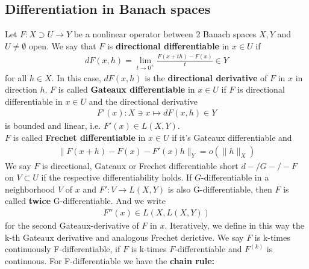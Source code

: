 \documentclass[a4paper,11pt,fleqn]{book}
\theoremstyle{definition}
\theoremstyle{remark}
\begin{document}
\subsection{Differentiation in Banach spaces}
Let $F: X \supset U \rightarrow Y$ be a nonlinear operator between 2 Banach spaces $X, Y$ and $U \neq \emptyset$ open. We say that $F$ is \textbf{directional differentiable} in $x \in U$ if 
\begin{align*}
	dF(x, h) = \lim_{t \rightarrow 0^+} \frac{F(x + th) - F(x)}{t} \in Y
\end{align*}
for all $h \in X$. In this case, $dF(x, h)$ is the \textbf{directional derivative} of $F$ in $x$ in direction $h$. $F$ is called \textbf{Gateaux differentiable} in $x \in U$ if $F$ is directional differentiable in $x \in U$ and the directional derivative 
\begin{align*}
	F'(x): X \ni x \mapsto dF(x,h) \in Y
\end{align*}
is bounded and linear, i.e. $F'(x) \in L(X, Y)$. \\
$F$ is called \textbf{Frechet differentiable} in $x \in U$ if it's Gateaux differentiable and 
\begin{align*}
	\|F(x + h) - F(x) - F'(x) h\|_Y = o(\|h\|_X)
\end{align*}
We say $F$ is directional, Gateaux or Frechet differentiable short $d- \slash G- \slash - F$ on $V \subset U$ if the respective differentiability holds. If $G$-differentiable in a neighborhood $V$ of $x$ and $F': V \rightarrow L(X, Y)$ is also G-differentiable, then $F$ is called \textbf{twice} G-differentiable. And we write 
\begin{align*}
	F''(x) \in L(X, L(X, Y))
\end{align*}
for the second Gateaux-derivative of $F$ in $x$. Iteratively, we define in this way the k-th Gateaux derivative and analogous Frechet derictive. We say $F$ is k-times continuously F-differentiable, if $F$ is k-times $F$-differentiable and $F^(k)$ is continuous. For F-differentiable we have the \textbf{chain rule:}
\end{document}
